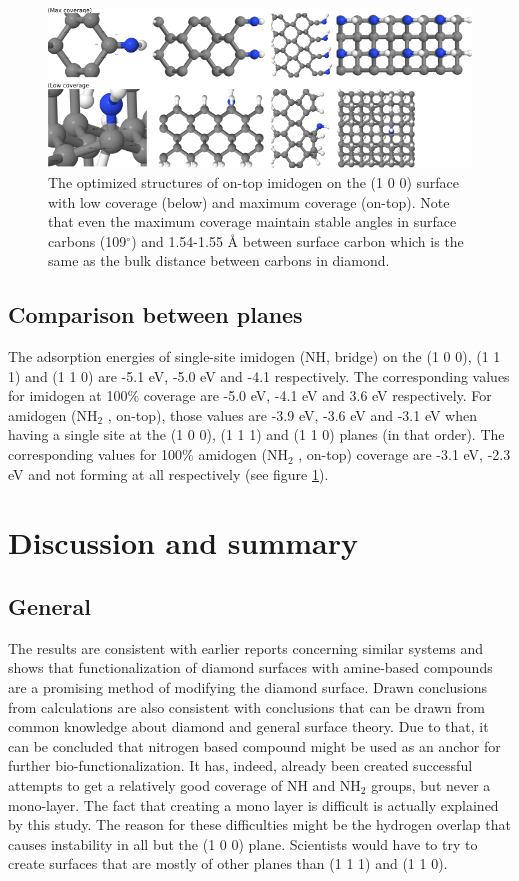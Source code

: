 \documentclass[12pt,a4paper]{article}
\begin{document}
\begin{figure} \captionsetup{width=.8\linewidth} \caption{The optimized structures of on-top imidogen on the (1 0 0) surface with low coverage (below) and maximum coverage (on-top). Note that even the maximum coverage maintain stable angles in surface carbons (109$^{\circ}$) and 1.54-1.55 Å between surface carbon which is the same as the bulk distance between carbons in diamond.} \label{NHdb_summary}
%
\includegraphics[width=.8\linewidth]{pictures/NHdb_summary.png}
\end{figure}



\subsection{Comparison between planes}
The adsorption energies of single-site imidogen (NH, bridge) on the (1 0 0), (1 1 1) and (1 1 0) are -5.1 eV, -5.0 eV and -4.1 respectively. The corresponding values for imidogen at 100\% coverage are -5.0 eV, -4.1 eV and 3.6 eV respectively. For amidogen (NH$_2$ , on-top), those values are -3.9 eV, -3.6 eV and -3.1 eV when having a single site at the (1 0 0), (1 1 1) and (1 1 0) planes (in that order). The corresponding values for 100\% amidogen (NH$_2$ , on-top) coverage are -3.1 eV, -2.3 eV and not forming at all respectively (see figure \ref{NHdb_summary}).

\section{Discussion and summary}
\subsection{General}
The results are consistent with earlier reports concerning similar systems and shows that functionalization of diamond surfaces with amine-based compounds are a promising method of modifying the diamond surface. Drawn conclusions from calculations are also consistent with conclusions that can be drawn from common knowledge about diamond and general surface theory. Due to that, it can be concluded that nitrogen based compound might be used as an anchor for further bio-functionalization. It has, indeed, already been created successful attempts to get a relatively good coverage of NH and NH$_2$ groups, but never a mono-layer. The fact that creating a mono layer is difficult is actually explained by this study. The reason for these difficulties might be the hydrogen overlap that causes instability in all but the (1 0 0) plane. Scientists would have to try to create surfaces that are mostly of other planes than (1 1 1) and (1 1 0). 
\end{document}
